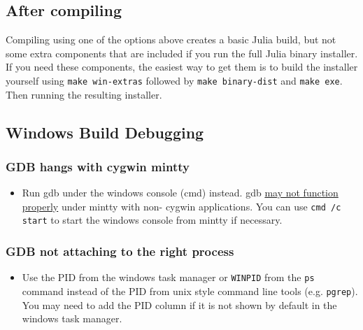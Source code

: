 \hypertarget{10640396420501361633}{}


\subsection{After compiling}



Compiling using one of the options above creates a basic Julia build, but not some extra components that are included if you run the full Julia binary installer. If you need these components, the easiest way to get them is to build the installer yourself using \texttt{make win-extras} followed by \texttt{make binary-dist} and \texttt{make exe}. Then running the resulting installer.



\hypertarget{10585766524694478249}{}


\subsection{Windows Build Debugging}



\hypertarget{12675452062080563616}{}


\subsubsection{GDB hangs with cygwin mintty}



\begin{itemize}
\item Run gdb under the windows console (cmd) instead. gdb \href{https://www.cygwin.com/ml/cygwin/2009-02/msg00531.html}{may not function properly} under mintty with non- cygwin applications. You can use \texttt{cmd /c start} to start the windows console from mintty if necessary.

\end{itemize}


\hypertarget{8856415863446835392}{}


\subsubsection{GDB not attaching to the right process}



\begin{itemize}
\item Use the PID from the windows task manager or \texttt{WINPID} from the \texttt{ps} command instead of the PID from unix style command line tools (e.g. \texttt{pgrep}).  You may need to add the PID column if it is not shown by default in the windows task manager.

\end{itemize}


